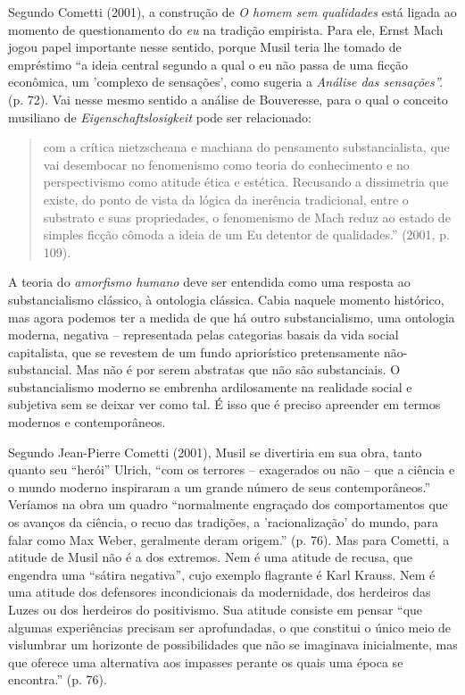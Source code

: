 Segundo Cometti (2001), a construção de \emph{O homem sem qualidades}
está ligada ao momento de questionamento do \emph{eu} na tradição
empirista. Para ele, Ernst Mach jogou papel importante nesse sentido,
porque Musil teria lhe tomado de empréstimo ``a ideia central segundo a
qual o eu não passa de uma ficção econômica, um 'complexo de sensações',
como sugeria a \emph{Análise das sensações''.} (p. 72). Vai nesse mesmo
sentido a análise de Bouveresse, para o qual o conceito musiliano de
\emph{Eigenschaftslosigkeit} pode ser relacionado:

\begin{quote}
com a crítica nietzscheana e machiana do pensamento substancialista, que
vai desembocar no fenomenismo como teoria do conhecimento e no
perspectivismo como atitude ética e estética. Recusando a dissimetria
que existe, do ponto de vista da lógica da inerência tradicional, entre
o substrato e suas propriedades, o fenomenismo de Mach reduz ao estado
de simples ficção cômoda a ideia de um Eu detentor de qualidades.''
(2001, p. 109).
\end{quote}

A teoria do \emph{amorfismo humano} deve ser entendida como uma resposta
ao substancialismo clássico, à ontologia clássica. Cabia naquele momento
histórico, mas agora podemos ter a medida de que há outro
substancialismo, uma ontologia moderna, negativa -- representada pelas
categorias basais da vida social capitalista, que se revestem de um
fundo apriorístico pretensamente não-substancial. Mas não é por serem
abstratas que não são substanciais. O substancialismo moderno se
embrenha ardilosamente na realidade social e subjetiva sem se deixar ver
como tal. É isso que é preciso apreender em termos modernos e
contemporâneos.

Segundo Jean-Pierre Cometti (2001), Musil se divertiria em sua obra,
tanto quanto seu ``herói'' Ulrich, ``com os terrores -- exagerados ou
não -- que a ciência e o mundo moderno inspiraram a um grande número de
seus contemporâneos.'' Veríamos na obra um quadro ``normalmente
engraçado dos comportamentos que os avanços da ciência, o recuo das
tradições, a 'racionalização' do mundo, para falar como Max Weber,
geralmente deram origem.'' (p. 76). Mas para Cometti, a atitude de Musil
não é a dos extremos. Nem é uma atitude de recusa, que engendra uma
``sátira negativa'', cujo exemplo flagrante é Karl Krauss. Nem é uma
atitude dos defensores incondicionais da modernidade, dos herdeiros das
Luzes ou dos herdeiros do positivismo. Sua atitude consiste em pensar
``que algumas experiências precisam ser aprofundadas, o que constitui o
único meio de vislumbrar um horizonte de possibilidades que não se
imaginava inicialmente, mas que oferece uma alternativa aos impasses
perante os quais uma época se encontra.'' (p. 76).

